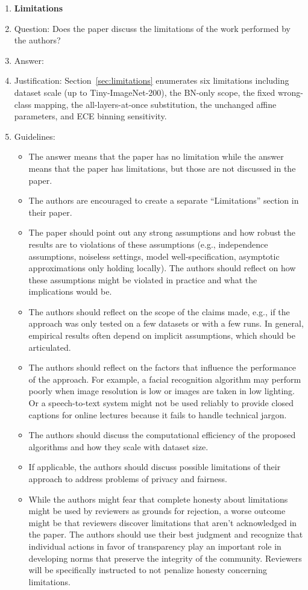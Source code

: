 \documentclass{article}
\begin{document}
\begin{enumerate}
\item {\bf Limitations}
    \item[] Question: Does the paper discuss the limitations of the work performed by the authors?
    \item[] Answer: \answerYes{}
    \item[] Justification: Section~\ref{sec:limitations} enumerates six limitations including dataset scale (up to Tiny-ImageNet-200), the BN-only scope, the fixed wrong-class mapping, the all-layers-at-once substitution, the unchanged affine parameters, and ECE binning sensitivity.
    \item[] Guidelines:
    \begin{itemize}
        \item The answer \answerNA{} means that the paper has no limitation while the answer \answerNo{} means that the paper has limitations, but those are not discussed in the paper.
        \item The authors are encouraged to create a separate ``Limitations'' section in their paper.
        \item The paper should point out any strong assumptions and how robust the results are to violations of these assumptions (e.g., independence assumptions, noiseless settings, model well-specification, asymptotic approximations only holding locally). The authors should reflect on how these assumptions might be violated in practice and what the implications would be.
        \item The authors should reflect on the scope of the claims made, e.g., if the approach was only tested on a few datasets or with a few runs. In general, empirical results often depend on implicit assumptions, which should be articulated.
        \item The authors should reflect on the factors that influence the performance of the approach. For example, a facial recognition algorithm may perform poorly when image resolution is low or images are taken in low lighting. Or a speech-to-text system might not be used reliably to provide closed captions for online lectures because it fails to handle technical jargon.
        \item The authors should discuss the computational efficiency of the proposed algorithms and how they scale with dataset size.
        \item If applicable, the authors should discuss possible limitations of their approach to address problems of privacy and fairness.
        \item While the authors might fear that complete honesty about limitations might be used by reviewers as grounds for rejection, a worse outcome might be that reviewers discover limitations that aren't acknowledged in the paper. The authors should use their best judgment and recognize that individual actions in favor of transparency play an important role in developing norms that preserve the integrity of the community. Reviewers will be specifically instructed to not penalize honesty concerning limitations.
    \end{itemize}


\end{enumerate}
\end{document}
